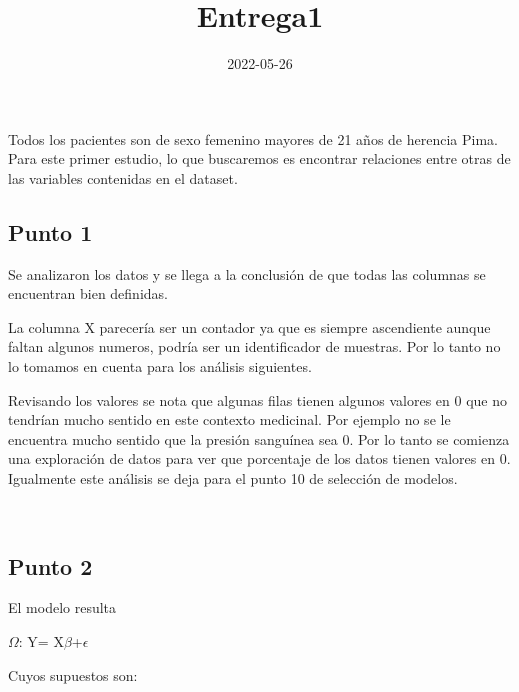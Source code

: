 \documentclass[
]{article}
\title{Entrega1}
\author{}
\date{\vspace{-2.5em}2022-05-26}
\begin{document}
\maketitle

Todos los pacientes son de sexo femenino mayores de 21 años de herencia
Pima. Para este primer estudio, lo que buscaremos es encontrar
relaciones entre otras de las variables contenidas en el dataset.

\hypertarget{punto-1}{%
\subsection{Punto 1}\label{punto-1}}

Se analizaron los datos y se llega a la conclusión de que todas las
columnas se encuentran bien definidas.

La columna X parecería ser un contador ya que es siempre ascendiente
aunque faltan algunos numeros, podría ser un identificador de muestras.
Por lo tanto no lo tomamos en cuenta para los análisis siguientes.

Revisando los valores se nota que algunas filas tienen algunos valores
en 0 que no tendrían mucho sentido en este contexto medicinal. Por
ejemplo no se le encuentra mucho sentido que la presión sanguínea sea 0.
Por lo tanto se comienza una exploración de datos para ver que
porcentaje de los datos tienen valores en 0. Igualmente este análisis se
deja para el punto 10 de selección de modelos.\\
\strut \\

\hypertarget{punto-2}{%
\subsection{\texorpdfstring{\textbf{Punto 2}}{Punto 2}}\label{punto-2}}

El modelo resulta

\(\Omega\): Y= X\(\beta\)+\(\epsilon\)

Cuyos supuestos son:
\end{document}
